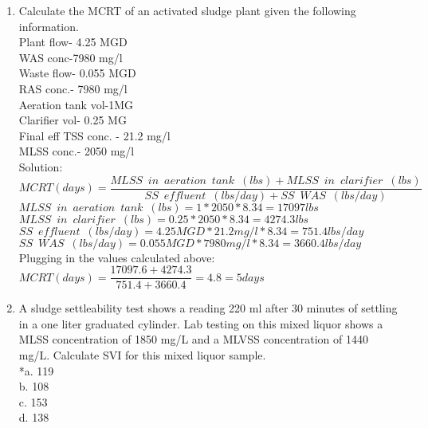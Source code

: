 \documentclass{article}
\begin{document}
\begin{enumerate}
\item Calculate the MCRT of an activated sludge plant given the following information.\\
Plant flow- 4.25 MGD\\
WAS conc-7980 mg/l\\
Waste flow- 0.055 MGD\\
RAS conc.- 7980 mg/l\\
Aeration tank vol-1MG\\  
Clarifier vol- 0.25 MG\\
Final eff TSS conc. - 21.2 mg/l\\
MLSS conc.- 2050 mg/l\\
\vspace{0.3cm}
Solution:\\
\vspace{0.3cm}
$MCRT (days) =  \dfrac{MLSS \enspace in \enspace aeration \enspace tank \enspace (lbs)+MLSS \enspace in \enspace clarifier \enspace (lbs)}{SS \enspace effluent \enspace (lbs/day)+SS \enspace WAS \enspace (lbs/day)}$\\
\vspace{0.3cm} 
$MLSS \enspace in \enspace aeration \enspace tank \enspace (lbs)=1*2050*8.34=17097lbs$\\
\vspace{0.3cm} 
$MLSS \enspace in \enspace clarifier \enspace (lbs)=0.25*2050*8.34=4274.3lbs$\\
\vspace{0.3cm} 
$SS \enspace effluent \enspace (lbs/day)=4.25MGD *21.2mg/l*8.34=751.4lbs/day$\\
\vspace{0.3cm} 
$SS \enspace WAS \enspace (lbs/day)=0.055MGD *7980mg/l*8.34=3660.4lbs/day$\\
\vspace{0.3cm} 
Plugging in the values calculated above: $MCRT (days) =  \dfrac{17097.6+4274.3}{751.4+3660.4}=4.8=\boxed{5days}$\\
\vspace{0.2cm}
\pagebreak


\item A sludge settleability test shows a reading 220 ml after 30 minutes of settling in a one liter graduated cylinder. Lab testing on this mixed liquor shows a MLSS concentration of 1850 mg/L and a MLVSS concentration of 1440 mg/L. Calculate SVI for this mixed liquor sample.\\

\vspace{0.5cm}
*a. 119 \\
b. 108 \\
c. 153 \\
d. 138 \\


\end{enumerate}
\end{document}
